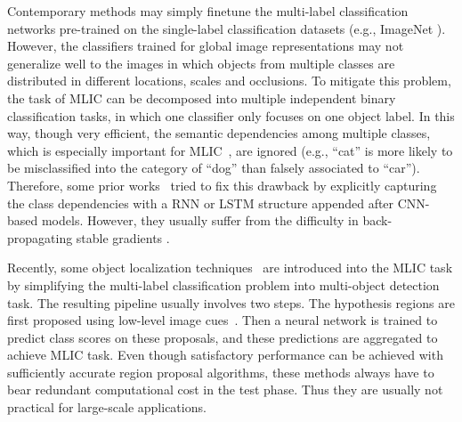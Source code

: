\documentclass[sigconf,natbib=false]{acmart}
\begin{document}
Contemporary methods may simply finetune the multi-label classification networks pre-trained on the single-label classification datasets (e.g., ImageNet \cite{ImageNet_ijcv15_ojhjsszaa}).
However, the classifiers trained for global image representations may not generalize well to the images in which objects from multiple classes are distributed in different locations, scales and occlusions.
To mitigate this problem, the task of MLIC can be decomposed into multiple independent binary classification tasks, in which one classifier only focuses on one object label.
In this way, though very efficient, the semantic dependencies among multiple classes, which is especially important for MLIC~\cite{MLIC6_cvpr16_JYJZCW}, are ignored (e.g., ``cat'' is more likely to be misclassified into the category of ``dog'' than falsely associated to ``car'').
Therefore, some prior works~\cite{MLIC6_cvpr16_JYJZCW,MLIC14_eccv16_hjj,MLIC18_aaai18_SYCY} tried to fix this drawback by explicitly capturing the class dependencies with a RNN or LSTM structure appended after CNN-based models.
However, they usually suffer from the difficulty in back-propagating stable gradients \cite{MLIC3_cvpr17_FTTWC}.



Recently, some object localization techniques~\cite{MLIC10_pami16_ywjbjys,MLIC21_arxiv17_JQJCJ, MLIC22_tmm18_jqjcj} are introduced into the MLIC task by simplifying the multi-label classification problem into multi-object detection task.
The resulting pipeline usually involves two steps.
The hypothesis regions are first proposed using low-level image cues~\cite{WSD4_iccv11_kjta}.
Then a neural network is trained to predict class scores on these proposals, and these predictions are aggregated to achieve MLIC task.
Even though satisfactory performance can be achieved with sufficiently accurate region proposal algorithms, these methods always have to bear redundant computational cost in the test phase. Thus they are usually not practical for large-scale applications.
\end{document}
